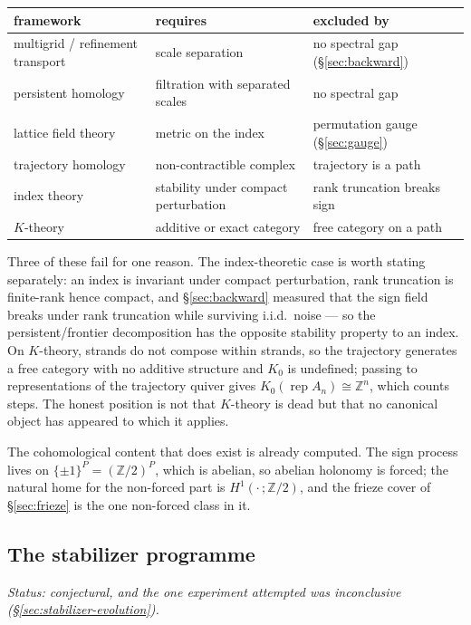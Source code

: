 \begin{center}
\begin{tabular}{lll}
\hline
framework & requires & excluded by \\
\hline
multigrid / refinement transport & scale separation & no spectral gap (\S\ref{sec:backward}) \\
persistent homology & filtration with separated scales & no spectral gap \\
lattice field theory & metric on the index & permutation gauge (\S\ref{sec:gauge}) \\
trajectory homology & non-contractible complex & trajectory is a path \\
index theory & stability under compact perturbation & rank truncation breaks sign \\
$K$-theory & additive or exact category & free category on a path \\
\hline
\end{tabular}
\end{center}

Three of these fail for one reason. The index-theoretic case is worth stating
separately: an index is invariant under compact perturbation, rank truncation is
finite-rank hence compact, and \S\ref{sec:backward} measured that the sign field
breaks under rank truncation while surviving i.i.d.\ noise --- so the
persistent/frontier decomposition has the opposite stability property to an
index. On $K$-theory, strands do not compose within strands, so the trajectory
generates a free category with no additive structure and $K_0$ is undefined;
passing to representations of the trajectory quiver gives
$K_0(\operatorname{rep}A_n)\cong\mathbb{Z}^n$, which counts steps. The honest
position is not that $K$-theory is dead but that no canonical object has
appeared to which it applies.

The cohomological content that does exist is already computed. The sign process
lives on $\{\pm1\}^P=(\mathbb{Z}/2)^P$, which is abelian, so abelian holonomy
is forced; the natural home for the non-forced part is
$H^1(\cdot\,;\mathbb{Z}/2)$, and the frieze cover of \S\ref{sec:frieze} is the
one non-forced class in it.

\subsection{The stabilizer programme}
\label{sec:stabilizer-programme}

\emph{Status: conjectural, and the one experiment attempted was inconclusive
(\S\ref{sec:stabilizer-evolution}).}

